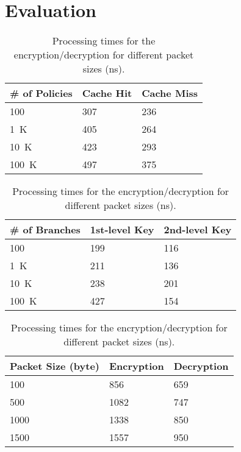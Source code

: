 \chapter{Evaluation}
\label{eval}


\begin{table}[htb]%
	\begin{minipage}{.47\linewidth}
		\caption{Benchmark results for the transfer policy lookup (ns).}
		\label{tab:authorization}
		\begin{tabularx}{1\linewidth}{X|XX}
			\toprule
			\# of Policies & Cache Hit & Cache Miss \\
			\midrule
			100            & 307       & 236        \\
			\SI{1}{K}      & 405       & 264        \\
			\SI{10}{K}     & 423       & 293        \\
			\SI{100}{K}    & 497       & 375        \\
			\bottomrule
		\end{tabularx}
	\end{minipage}
	\begin{minipage}{.47\linewidth}
		\caption{Key derivation times for different network sizes (ns).}
		\label{tab:derivation}
		\begin{tabularx}{1\linewidth}{X|XX}
			\toprule
			\# of Branches & 1st-level Key & 2nd-level Key \\
			\midrule
			100            & 199           & 116           \\	%
			\SI{1}{K}      & 211           & 136           \\	%
			\SI{10}{K}     & 238           & 201           \\	%
			\SI{100}{K}    & 427           & 154           \\	%
			\bottomrule
		\end{tabularx}
	\end{minipage}\vspace{2em}
	\begin{minipage}{.47\linewidth}
		\caption{Processing times for the encryption/decryption for different packet sizes (ns).}
		\label{tab:authentication}
		\begin{tabularx}{1\linewidth}{X|XX}
			\toprule
			Packet Size (byte) & Encryption & Decryption \\
			\midrule
			100                & 856        & 659        \\
			500                & 1082       & 747        \\
			1000               & 1338       & 850        \\
			1500               & 1557       & 950        \\
			\bottomrule
		\end{tabularx}
	\end{minipage}
\end{table}

